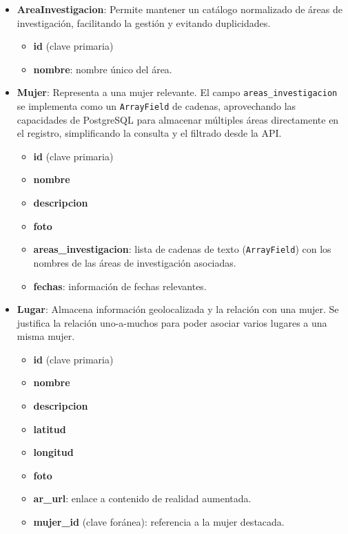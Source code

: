 \begin{itemize}
    \item \textbf{AreaInvestigacion}: Permite mantener un catálogo normalizado de áreas de investigación, facilitando la gestión y evitando duplicidades.
    \begin{itemize}
        \item \textbf{id} (clave primaria)
        \item \textbf{nombre}: nombre único del área.
    \end{itemize}
    \item \textbf{Mujer}: Representa a una mujer relevante. El campo \texttt{areas\_investigacion} se implementa como un \texttt{ArrayField} de cadenas, aprovechando las capacidades de PostgreSQL para almacenar múltiples áreas directamente en el registro, simplificando la consulta y el filtrado desde la API.
    \begin{itemize}
        \item \textbf{id} (clave primaria)
        \item \textbf{nombre}
        \item \textbf{descripcion}
        \item \textbf{foto}
        \item \textbf{areas\_investigacion}: lista de cadenas de texto (\texttt{ArrayField}) con los nombres de las áreas de investigación asociadas.
        \item \textbf{fechas}: información de fechas relevantes.
    \end{itemize}
    \item \textbf{Lugar}: Almacena información geolocalizada y la relación con una mujer. Se justifica la relación uno-a-muchos para poder asociar varios lugares a una misma mujer.
    \begin{itemize}
        \item \textbf{id} (clave primaria)
        \item \textbf{nombre}
        \item \textbf{descripcion}
        \item \textbf{latitud}
        \item \textbf{longitud}
        \item \textbf{foto}
        \item \textbf{ar\_url}: enlace a contenido de realidad aumentada.
        \item \textbf{mujer\_id} (clave foránea): referencia a la mujer destacada.
    \end{itemize}

\end{itemize}

